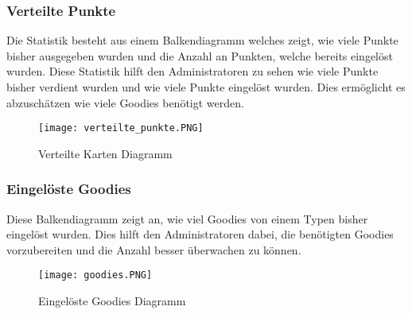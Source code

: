 \subsubsection{Verteilte Punkte}
Die Statistik besteht aus einem Balkendiagramm welches zeigt, wie viele Punkte bisher ausgegeben wurden und die Anzahl an Punkten, welche bereits eingelöst wurden. 
Diese Statistik hilft den Administratoren zu sehen wie viele Punkte bisher verdient wurden und wie viele Punkte eingelöst wurden. Dies ermöglicht es abzuschätzen wie viele Goodies benötigt werden. 	
\begin{figure}[H]
	\centering
	\texttt{[image: verteilte\_punkte.PNG]}
	\caption{Verteilte Karten Diagramm}
\end{figure}
\newpage
\subsubsection{Eingelöste Goodies}
Diese Balkendiagramm zeigt an, wie viel Goodies von einem Typen bisher eingelöst wurden. Dies hilft den Administratoren dabei, die benötigten Goodies vorzubereiten und die Anzahl besser überwachen zu können. 
\begin{figure}[H]
	\centering
	\texttt{[image: goodies.PNG]}
	\caption{Eingelöste Goodies Diagramm}
\end{figure}